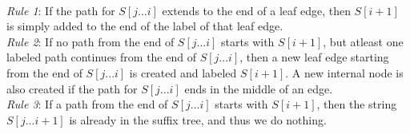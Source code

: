 \documentclass[11pt,a4paper]{article}
\begin{document}
\\
\emph{Rule 1}: If the path for \begin{math}S[j...i]\end{math} extends to the end of a leaf edge, then \begin{math}S[i+1]\end{math} is simply added to the end of the label of that leaf edge.
\\
\emph{Rule 2}: If no path from the end of \begin{math}S[j...i]\end{math} starts with \begin{math}S[i+1]\end{math}, but atleast one labeled path continues from the end of \begin{math}S[j...i]\end{math}, then a new leaf edge starting from the end of \begin{math}S[j...i]\end{math} is created and labeled \begin{math}S[i+1]\end{math}. A new internal node is also created if the path for \begin{math}S[j...i]\end{math} ends in the middle of an edge.
\\
\emph{Rule 3}: If a path from the end of \begin{math}S[j...i]\end{math} starts with \begin{math}S[i+1]\end{math}, then the string \begin{math}S[j...i+1]\end{math} is already in the suffix tree, and thus we do nothing.
\end{document}
